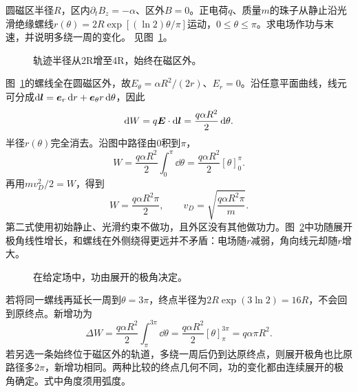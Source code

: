 \begin{exercise}[圆磁区外沿螺线运动的功]\label{ex:i1-h12}
圆磁区半径$R$，区内$\partial_tB_z=-\alpha$、区外$B=0$。正电荷$q$、质量$m$的珠子从静止沿光滑绝缘螺线$r(\theta)=2R\exp[(\ln2)\theta/\pi]$运动，$0\le\theta\le\pi$。求电场作功与末速，并说明多绕一周的变化。 见图~\ref{fig:i1-h12-q}。
\end{exercise}

\begin{figure}[H]\centering
{}
\caption{轨迹半径从2R增至4R，始终在磁区外。}\label{fig:i1-h12-q}
\end{figure}
\begin{solution}
图~\ref{fig:i1-h12-q}的螺线全在圆磁区外，故$E_\theta=\alpha R^2/(2r)$、$E_r=0$。沿任意平面曲线，线元可分成$\mathop{}\!\mathrm d\bm{l}=\bm{e}_r\mathop{}\!\mathrm d r+\bm{e}_\theta r\mathop{}\!\mathrm d\theta$，因此
\[\mathop{}\!\mathrm d W=q\bm{E}\cdot\mathop{}\!\mathrm d\bm{l}
=\frac{q\alpha R^2}{2}\mathop{}\!\mathrm d\theta.
\]
半径$r(\theta)$完全消去。沿图中路径由$0$积到$\pi$，
\[W=\frac{q\alpha R^2}{2}\int_0^\pi\dd\theta
=\frac{q\alpha R^2}{2}[\theta]_0^\pi.\]
再用$mv_D^2/2=W$，得到
\[\boxed{W=\frac{q\alpha R^2\pi}{2}},\qquad
\boxed{v_D=\sqrt{\frac{q\alpha R^2\pi}{m}}}.
\]
第二式使用初始静止、光滑约束不做功，且外区没有其他做功力。图~\ref{fig:i1-h12-s}中功随展开极角线性增长，和螺线在外侧绕得更远并不矛盾：电场随$r$减弱，角向线元却随$r$增大。


\begin{figure}[H]\centering
{}
\caption{在给定场中，功由展开的极角决定。}\label{fig:i1-h12-s}
\end{figure}

若将同一螺线再延长一周到$\theta=3\pi$，终点半径为$2R\exp(3\ln2)=16R$，不会回到原终点。新增功为
\[\Delta W=\frac{q\alpha R^2}{2}\int_\pi^{3\pi}\dd\theta
=\frac{q\alpha R^2}{2}[\theta]_\pi^{3\pi}
=q\alpha\pi R^2.\]
若另选一条始终位于磁区外的轨道，多绕一周后仍到达原终点，则展开极角也比原路径多$2\pi$，新增功相同。两种比较的终点几何不同，功的变化都由连续展开的极角确定。式中角度须用弧度。
\end{solution}

